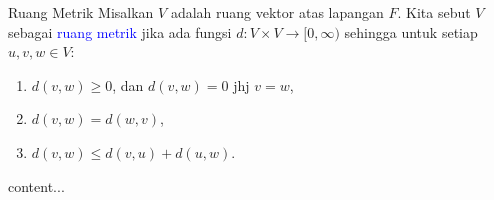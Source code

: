 \documentclass[xcolor={dvipsnames}]{beamer}
\newcommand{\emp}[1]{\textcolor{Blue}{#1}}
\begin{document}
	\begin{frame}{Ruang Metrik}
		Misalkan $V$ adalah ruang vektor atas lapangan $F$. Kita sebut $V$ sebagai \emp{ruang metrik} jika ada fungsi $d:V\times V\to [0,\infty)$ sehingga untuk setiap $u,v,w\in V$:
		\begin{enumerate}
			\item $d(v,w) \geq 0$, dan $d(v,w) = 0$ jhj $v=w$,
			\item $d(v,w) = d(w,v)$,
			\item $d(v,w) \leq d(v,u) + d(u,w)$.
		\end{enumerate}
	\end{frame}
	\begin{frame}{}
		content...
	\end{frame}
\end{document}
